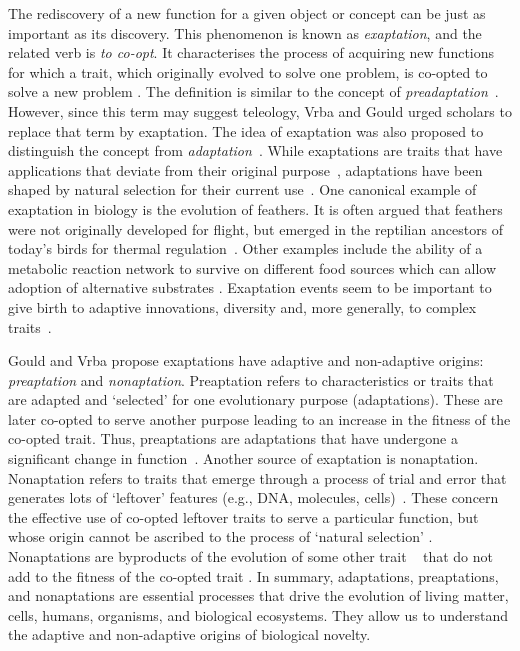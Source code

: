 \documentclass[draft,final]{vutinfth} %
\begin{document}
The rediscovery of a new function for a given object or concept can be just as important as its discovery. This phenomenon is known as \emph{exaptation}, and the related verb is \emph{to co-opt}. It characterises the process of acquiring new functions for which a trait, which originally evolved to solve one problem, is co-opted to solve a new problem \cite{gould1982exaptation}. The definition is similar to the concept of \emph{preadaptation}~\cite{bock1959preadaptation}. However, since this term may suggest teleology, Vrba and Gould urged scholars to replace that term by exaptation. The idea of exaptation was also proposed to distinguish the concept from \emph{adaptation}~\cite{darwin2004origin}. While exaptations are traits that have applications that deviate from their original purpose~\cite{gould1982exaptation,kauffman2000investigations}, adaptations have been shaped by natural selection for their current use~\cite{bock1959preadaptation,darwin2004origin}. One canonical example of exaptation in biology is the evolution of feathers.  It is often argued that feathers were not originally developed for flight, but emerged in the reptilian ancestors of today's birds for thermal regulation~\cite{gould1982exaptation}.  Other examples include the ability of a metabolic reaction network to survive on different food sources which can allow adoption of alternative substrates \cite{barve2013latent}.
Exaptation events seem to be important to give birth to adaptive innovations, diversity and, more generally, to complex traits~\cite{barve2013latent}.

Gould and Vrba propose exaptations have adaptive and non-adaptive origins: \emph{preaptation} and \emph{nonaptation}. Preaptation refers to characteristics or traits that are adapted and `selected' for one evolutionary purpose (adaptations). These are later co-opted to serve another purpose leading to an increase in the fitness of the co-opted trait. Thus, preaptations are adaptations that have undergone a significant change in function~\cite{gould1982exaptation,lloyd2017exaptation}. Another source of exaptation is nonaptation. Nonaptation refers to traits that emerge through a process of trial and error that generates lots of `leftover' features (e.g., DNA, molecules, cells)~\cite{gould1982exaptation}. These concern the effective use of co-opted leftover traits to serve a particular function, but whose origin cannot be ascribed to the process of `natural selection' \cite{gould1982exaptation}. Nonaptations are byproducts of the evolution of some other trait ~\cite{darwin2004origin} that do not add to the fitness of the co-opted trait \cite{lloyd2017exaptation,gould1982exaptation}. In summary, adaptations, preaptations, and nonaptations are essential processes that drive the evolution of living matter, cells, humans, organisms, and biological ecosystems.  They allow us to understand the adaptive and non-adaptive origins of biological novelty.
\end{document}
